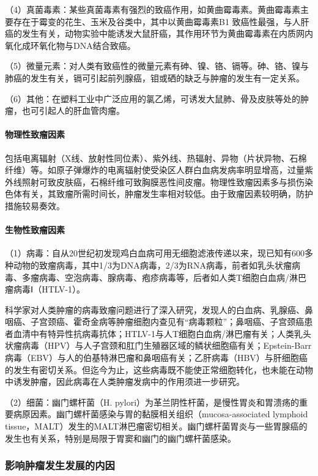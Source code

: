 （4）真菌毒素：某些真菌毒素有强烈的致癌作用，如黄曲霉毒素。黄曲霉毒素主要存在于霉变的花生、玉米及谷类中，其中以黄曲霉毒素B{1}
致癌性最强，与人肝癌的发生有关，动物实验中能诱发大鼠肝癌，其作用环节为黄曲霉毒素在内质网内氧化成环氧化物与DNA结合致癌。

（5）微量元素：对人类有致癌性的微量元素有砷、镍、铬、镉等。砷、铬、镍与肺癌的发生有关，镉可引起前列腺癌，钼或硒的缺乏与肿瘤的发生有一定关系。

（6）其他：在塑料工业中广泛应用的氯乙烯，可诱发大鼠肺、骨及皮肤等处的肿瘤，也可引起人的肝血管肉瘤。

\paragraph{物理性致瘤因素}
包括电离辐射（X线、放射性同位素）、紫外线、热辐射、异物（片状异物、石棉纤维）等。如原子弹爆炸的电离辐射使受染区人群白血病发病率明显增高，过量紫外线照射可致皮肤癌，石棉纤维可致胸膜恶性间皮瘤。物理性致瘤因素多与损伤染色体有关，其致瘤所需时间长，肿瘤发生率相对较低。由于致瘤因素较明确，防护措施较易奏效。

\paragraph{生物性致瘤因素}
（1）病毒：自从20世纪初发现鸡白血病可用无细胞滤液传递以来，现已知有600多种动物的致瘤病毒，其中1/3为DNA病毒，2/3为RNA病毒，前者如乳头状瘤病毒、多瘤病毒、空泡病毒、腺病毒、疱疹病毒等，后者如人类T细胞白血病/淋巴瘤病毒Ⅰ（HTLV-1）。

科学家对人类肿瘤的病毒致瘤问题进行了深入研究，发现人的白血病、乳腺癌、鼻咽癌、子宫颈癌、霍奇金病等肿瘤细胞内查见有“病毒颗粒”；鼻咽癌、子宫颈癌患者血清中有特异性抗病毒抗体；HTLV-1与人T细胞白血病/淋巴瘤有关；人类乳头状瘤病毒（HPV）与人子宫颈和肛门生殖器区域的鳞状细胞癌有关；Epstein-Barr病毒（EBV）与人的伯基特淋巴瘤和鼻咽癌有关；乙肝病毒（HBV）与肝细胞癌的发生有密切关系。但迄今为止，这些病毒既不能使正常细胞转化，也未能在动物中诱发肿瘤，因此病毒在人类肿瘤发病中的作用须进一步研究。

（2）细菌：幽门螺杆菌（H.
pylori）为革兰阴性杆菌，是慢性胃炎和胃溃疡的重要病原因素。幽门螺杆菌感染与胃的黏膜相关组织（mucosa-associated
lymphoid
tissue，MALT）发生的MALT淋巴瘤密切相关。幽门螺杆菌胃炎与一些胃腺癌的发生也有关系，特别是局限于胃窦和幽门的幽门螺杆菌感染。

{ \subsubsection{影响肿瘤发生发展的内因} }

